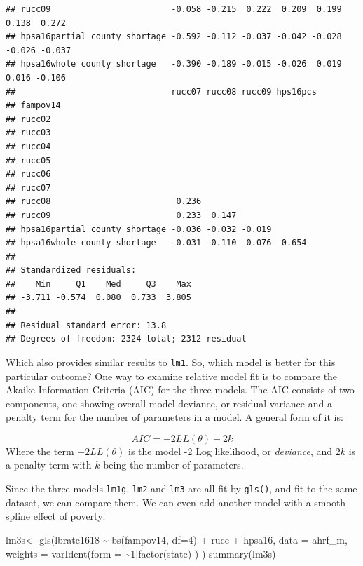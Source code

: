 \documentclass[
]{article}
\newenvironment{Shaded}{\begin{snugshade}}{\end{snugshade}}
\newcommand{\AttributeTok}[1]{\textcolor[rgb]{0.77,0.63,0.00}{#1}}
\newcommand{\DecValTok}[1]{\textcolor[rgb]{0.00,0.00,0.81}{#1}}
\newcommand{\FunctionTok}[1]{\textcolor[rgb]{0.00,0.00,0.00}{#1}}
\newcommand{\NormalTok}[1]{#1}
\newcommand{\OtherTok}[1]{\textcolor[rgb]{0.56,0.35,0.01}{#1}}
\newcommand{\SpecialCharTok}[1]{\textcolor[rgb]{0.00,0.00,0.00}{#1}}
\begin{document}
\begin{verbatim}
## rucc09                        -0.058 -0.215  0.222  0.209  0.199  0.138  0.272
## hpsa16partial county shortage -0.592 -0.112 -0.037 -0.042 -0.028 -0.026 -0.037
## hpsa16whole county shortage   -0.390 -0.189 -0.015 -0.026  0.019  0.016 -0.106
##                               rucc07 rucc08 rucc09 hps16pcs
## fampov14                                                   
## rucc02                                                     
## rucc03                                                     
## rucc04                                                     
## rucc05                                                     
## rucc06                                                     
## rucc07                                                     
## rucc08                         0.236                       
## rucc09                         0.233  0.147                
## hpsa16partial county shortage -0.036 -0.032 -0.019         
## hpsa16whole county shortage   -0.031 -0.110 -0.076  0.654  
## 
## Standardized residuals:
##    Min     Q1    Med     Q3    Max 
## -3.711 -0.574  0.080  0.733  3.805 
## 
## Residual standard error: 13.8 
## Degrees of freedom: 2324 total; 2312 residual
\end{verbatim}

Which also provides similar results to \texttt{lm1}. So, which model is better for this particular outcome? One way to examine relative model fit is to compare the Akaike Information Criteria (AIC) for the three models. The AIC consists of two components, one showing overall model deviance, or residual variance and a penalty term for the number of parameters in a model. A general form of it is:

\[
AIC = -2LL(\theta) + 2k
\]
Where the term \(-2LL(\theta)\) is the model -2 Log likelihood, or \emph{deviance}, and \(2k\) is a penalty term with \(k\) being the number of parameters.

Since the three models \texttt{lm1g}, \texttt{lm2} and \texttt{lm3} are all fit by \texttt{gls()}, and fit to the same dataset, we can compare them. We can even add another model with a smooth spline effect of poverty:

\begin{Shaded}
\begin{Highlighting}[]
\NormalTok{lm3s}\OtherTok{\textless{}{-}} \FunctionTok{gls}\NormalTok{(lbrate1618 }\SpecialCharTok{\textasciitilde{}}  \FunctionTok{bs}\NormalTok{(fampov14, }\AttributeTok{df=}\DecValTok{4}\NormalTok{) }\SpecialCharTok{+}\NormalTok{ rucc }\SpecialCharTok{+}\NormalTok{ hpsa16,}
          \AttributeTok{data =}\NormalTok{ ahrf\_m, }
          \AttributeTok{weights =} \FunctionTok{varIdent}\NormalTok{(}\AttributeTok{form =} \SpecialCharTok{\textasciitilde{}}\DecValTok{1}\SpecialCharTok{|}\FunctionTok{factor}\NormalTok{(state) ) )}
\FunctionTok{summary}\NormalTok{(lm3s)}
\end{Highlighting}
\end{Shaded}
\end{document}
